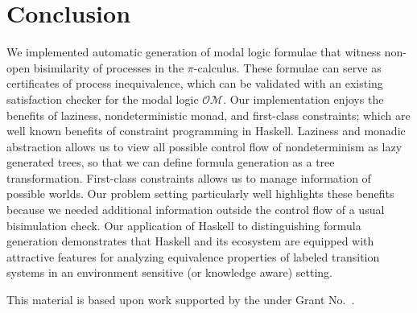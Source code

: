 \documentclass[sigplan,10pt,review]{acmart}\settopmatter{printfolios=true}
\newcommand{\OM}[0]{\ensuremath{\mathcal{O\!M}}}
\begin{document}
\section{Conclusion}
\label{sec:concl}
We implemented automatic generation of modal logic formulae that witness
non-open bisimilarity of processes in the $\pi$-calculus.
These formulae can serve as certificates of process inequivalence,
which can be validated with an existing satisfaction checker for the modal logic \OM.
Our implementation enjoys the benefits of laziness, nondeterministic monad, and
first-class constraints; which are well known benefits of constraint programming
in Haskell. Laziness and monadic abstraction allows us to view all possible
control flow of nondeterminism as lazy generated trees, so that we can define
formula generation as a tree transformation. First-class constraints allows us
to manage information of possible worlds. Our problem setting particularly well
highlights these benefits because we needed additional information outside
the control flow of a usual bisimulation check. Our application of Haskell to
distinguishing formula generation demonstrates that Haskell and its ecosystem
are equipped with attractive features for analyzing equivalence properties of
labeled transition systems in an environment sensitive (or knowledge aware) setting.

\begin{acks}                            %
  This material is based upon work supported by the
  under Grant No.~.
\end{acks}





\end{document}
